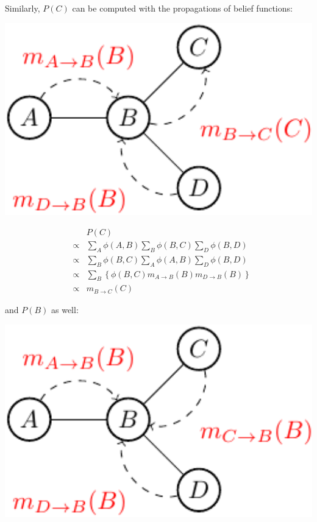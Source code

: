 Similarly, $P(C)$ can be computed with the propagations of belief functions: 
\newline
\begin{minipage}[c]{0.4\textwidth}
      \centering
      \includegraphics[width=1.1\textwidth]{./Figures/message_passing_2}
\end{minipage}
\begin{minipage}[c]{0.6\textwidth}
 \begin{equation*}
  \begin{array}{rcl}
  & & P(C) \\
  &\propto& \sum_{A}\phi(A,B) \sum_B \phi(B,C) \sum_D \phi(B,D)\\ 
  &\propto& \sum_B \phi(B,C)  \sum_{A}\phi(A,B) \sum_D \phi(B,D)\\ 
  &\propto& \sum_{B} \left\{   \phi(B,C) m_{A\rightarrow B}(B) m_{D\rightarrow B}(B) \right\} \\
  &\propto& m_{B\rightarrow C}(C)
  \end{array}
 \end{equation*}
\end{minipage}
\newline 
\newline 
\newline 
and $P(B)$ as well:
\newline 
\newline 
\begin{minipage}[c]{0.4\textwidth}
      \centering
      \includegraphics[width=1.1\textwidth]{./Figures/message_passing_3}
\end{minipage}
